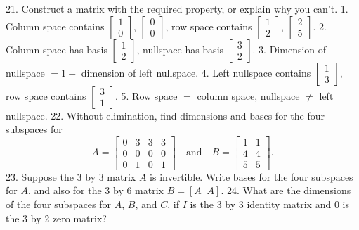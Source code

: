 21. Construct a matrix with the required property, or explain why you can't. 1. Column space contains \(\begin{bmatrix}1\\ 0\end{bmatrix}\), \(\begin{bmatrix}0\\ 0\end{bmatrix}\), row space contains \(\begin{bmatrix}1\\ 2\end{bmatrix}\), \(\begin{bmatrix}2\\ 5\end{bmatrix}\). 2. Column space has basis \(\begin{bmatrix}1\\ 2\end{bmatrix}\), nullspace has basis \(\begin{bmatrix}3\\ 2\end{bmatrix}\). 3. Dimension of nullspace \(=1+\) dimension of left nullspace. 4. Left nullspace contains \(\begin{bmatrix}1\\ 3\end{bmatrix}\), row space contains \(\begin{bmatrix}3\\ 1\end{bmatrix}\). 5. Row space \(=\) column space, nullspace \(\neq\) left nullspace.
22. Without elimination, find dimensions and bases for the four subspaces for \[A=\begin{bmatrix}0&3&3&3\\ 0&0&0&0\\ 0&1&0&1\end{bmatrix}\quad\text{and}\quad B=\begin{bmatrix}1&1\\ 4&4\\ 5&5\end{bmatrix}.\]
23. Suppose the 3 by 3 matrix \(A\) is invertible. Write bases for the four subspaces for \(A\), and also for the 3 by 6 matrix \(B=[A\;\;A]\).
24. What are the dimensions of the four subspaces for \(A\), \(B\), and \(C\), if \(I\) is the 3 by 3 identity matrix and 0 is the 3 by 2 zero matrix? 